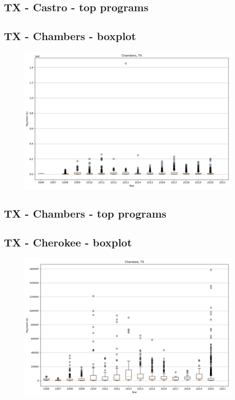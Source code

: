 \subsection*{TX - Castro - top programs}

\newpage
\subsection*{TX - Chambers - boxplot}
\begin{figure}[h]
\centering
\includegraphics[width=7in]{../output/boxplots/counties/Chambers-TX_boxplot.png}
\end{figure}


\subsection*{TX - Chambers - top programs}

\newpage
\subsection*{TX - Cherokee - boxplot}
\begin{figure}[h]
\centering
\includegraphics[width=7in]{../output/boxplots/counties/Cherokee-TX_boxplot.png}
\end{figure}


